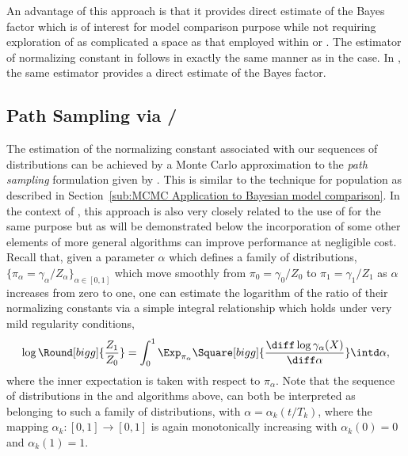 

An advantage of this approach is that it provides direct estimate of the Bayes
factor which is of interest for model comparison purpose while not requiring
exploration of as complicated a space as that employed within \rjmcmc or
\smc[1]. The estimator of normalizing constant in \smc[3] follows in
exactly the same manner as in the \smc[2] case. In \smc[3], the same estimator
provides a direct estimate of the Bayes factor.

\subsection{Path Sampling via \smc[2]/\smc[3]}
\label{sub:Path Sampling via smc2/smc3}

The estimation of the normalizing constant associated with our sequences of
distributions can be achieved by a Monte Carlo approximation to the \emph{path
  sampling} formulation given by \cite{Gelman:1998ei}. This is similar to the
technique for population \mcmc as described in Section~\ref{sub:MCMC
  Application to Bayesian model comparison}. In the context of \smc, this
approach is also very closely related to the use of \ais for the same purpose
\cite{Neal:2001we} but as will be demonstrated below the incorporation of some
other elements of more general \smc algorithms can improve performance at
negligible cost. Recall that, given a parameter $\alpha$ which defines a
family of distributions, $\{\pi_{\alpha} = \gamma_{\alpha} / Z_\alpha\}_{\alpha \in
  [0,1]}$ which move smoothly from $\pi_0 = \gamma_0 / Z_0$ to $\pi_1 =
\gamma_1 / Z_1$ as $\alpha$ increases from zero to one, one can estimate the
logarithm of the ratio of their normalizing constants via a simple integral
relationship which holds under very mild regularity conditions,
\begin{equation*}
  \log\Round[bigg]{\frac{Z_1}{Z_0}} =
  \int_{0}^{1} \Exp_{\pi_\alpha} \Square[bigg]{
    \frac{\diff\log\gamma_{\alpha}(X)}{\diff\alpha}
  } \intd\alpha,
\end{equation*}
where the inner expectation is taken with respect to $\pi_{\alpha}$. Note that
the sequence of distributions in the \smc[2] and \smc[3] algorithms above, can
both be interpreted as belonging to such a family of distributions, with
$\alpha = \alpha_k(t/T_k)$, where the mapping $\alpha_k:[0,1]\to[0,1]$ is
again monotonically increasing with $\alpha_k(0) = 0$ and $\alpha_k(1) = 1$.

